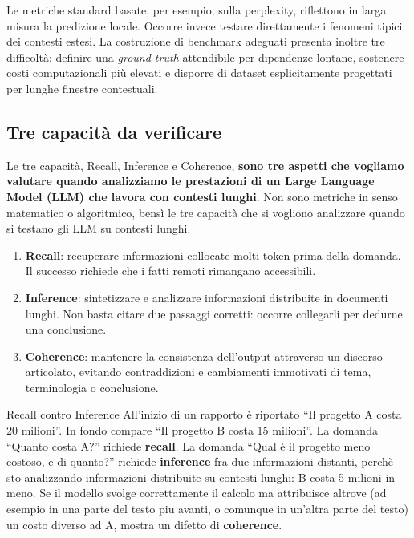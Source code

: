 Le metriche standard basate, per esempio, sulla perplexity, riflettono in larga misura la predizione locale. Occorre invece testare direttamente i fenomeni tipici dei contesti estesi. La costruzione di benchmark adeguati presenta inoltre tre difficoltà: definire una \emph{ground truth} attendibile per dipendenze lontane, sostenere costi computazionali più elevati e disporre di dataset esplicitamente progettati per lunghe finestre contestuali.

\subsection{Tre capacità da verificare}
Le tre capacità, Recall, Inference e Coherence, \textbf{sono tre aspetti che vogliamo valutare quando analizziamo le prestazioni di un Large Language Model (LLM) che lavora con contesti lunghi}.
Non sono metriche in senso matematico o algoritmico, bensì le tre capacità che si vogliono analizzare quando si testano gli LLM su contesti lunghi.
\begin{enumerate}
\item \textbf{Recall}: recuperare informazioni collocate molti token prima della domanda. Il successo richiede che i fatti remoti rimangano accessibili.
\item \textbf{Inference}: sintetizzare e analizzare informazioni distribuite in documenti lunghi. Non basta citare due passaggi corretti: occorre collegarli per dedurne una conclusione.
\item \textbf{Coherence}: mantenere la consistenza dell'output attraverso un discorso articolato, evitando contraddizioni e cambiamenti immotivati di tema, terminologia o conclusione.
\end{enumerate}

\begin{example}{Recall contro Inference}
All'inizio di un rapporto è riportato ``Il progetto A costa 20 milioni''. In fondo compare ``Il progetto B costa 15 milioni''. La domanda ``Quanto costa A?'' richiede \textbf{recall}. La domanda ``Qual è il progetto meno costoso, e di quanto?'' richiede \textbf{inference} fra due informazioni distanti, perchè sto analizzando informazioni distribuite su contesti lunghi: B costa 5 milioni in meno. Se il modello svolge correttamente il calcolo ma attribuisce altrove (ad esempio in una parte del testo piu avanti, o comunque in un'altra parte del testo) un costo diverso ad A, mostra un difetto di \textbf{coherence}.
\end{example}


